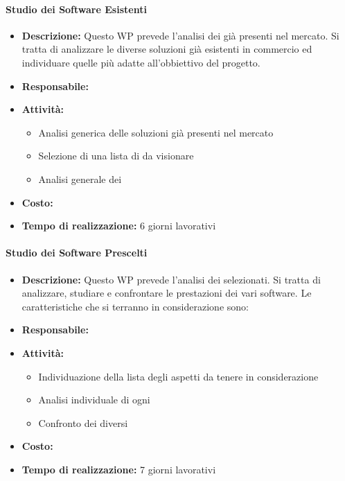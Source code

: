 \paragraph{Studio dei Software Esistenti }
\begin{itemize}
\item{\bfseries Descrizione:} Questo WP prevede l'analisi dei  già presenti nel mercato. Si tratta di analizzare le diverse soluzioni già esistenti in commercio ed individuare quelle più adatte all'obbiettivo del progetto. 

\item {\bfseries Responsabile:}
\item  {\bfseries Attività:}
		\begin{itemize}
		\item Analisi generica delle soluzioni  già presenti nel mercato
		\item Selezione di una lista di  da visionare
		\item Analisi generale dei 
		\end{itemize}

\item  {\bfseries Costo:}
\item  {\bfseries Tempo di realizzazione:} 6 giorni lavorativi
\end{itemize}

\paragraph{Studio dei Software Prescelti}
\begin{itemize}
\item{\bfseries Descrizione:}  Questo WP prevede l'analisi dei  selezionati. Si tratta di analizzare, studiare e confrontare le prestazioni dei vari software. Le caratteristiche che si terranno in considerazione sono:

\item {\bfseries Responsabile:}
\item  {\bfseries Attività:}
\begin{itemize}

		\item Individuazione della lista degli aspetti da tenere in considerazione
		\item Analisi individuale di ogni 
		\item Confronto dei diversi 
		\end{itemize}

\item  {\bfseries Costo:}
\item  {\bfseries Tempo di realizzazione:} 7 giorni lavorativi
\end{itemize}


